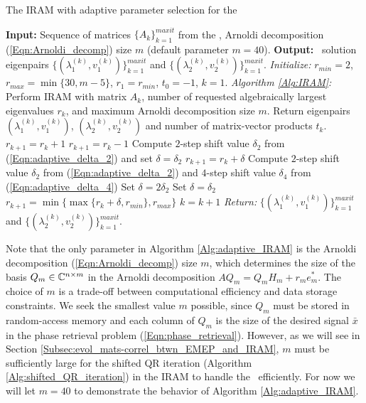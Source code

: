 \begin{algorithm}[H]
\caption{The IRAM with adaptive parameter selection for the \emep}	\label{Alg:adaptive_IRAM}

\begin{algorithmic}[1]
	\Statex 	\textbf{Input:} Sequence of matrices $\{ A_k \}_{k=1}^{maxit}$ from the \emep, Arnoldi decomposition (\ref{Eqn:Arnoldi_decomp})  size $m$ (default parameter $m = 40$).
	\Statex 	\textbf{Output:} \emep \ solution eigenpairs $\{ (\lambda_1^{(k)}, v_1^{(k)}) \}_{k=1}^{maxit}$ and  $\{ (\lambda_2^{(k)}, v_2^{(k)}) \}_{k=1}^{maxit}$.
	\State		\textit{Initialize:} $r_{min}=2$, $r_{max} = \min\{ 30, m-5 \}$, $r_1=r_{min}$, $t_0=-1$, $k=1$.
		\State		\textit{Algorithm \ref{Alg:IRAM}:} Perform IRAM with matrix $A_k$, number of requested algebraically largest eigenvalues $r_k$, and maximum Arnoldi decomposition size $m$.  Return eigenpairs $(\lambda_1^{(k)}, v_1^{(k)} )$, $(\lambda_2^{(k)}, v_2^{(k)} )$ and number of matrix-vector products $t_k$.
			\State 		$r_{k+1} = r_k + 1$
			\State		$r_{k+1} = r_k - 1$
			\State		Compute $2$-step shift value $\delta_2$ from (\ref{Eqn:adaptive_delta_2}) and set $\delta = \delta_2$
			\State		$r_{k+1} = r_k + \delta$
		\Else
			\State 		Compute $2$-step shift value $\delta_2$ from (\ref{Eqn:adaptive_delta_2}) and $4$-step shift value $\delta_4$ from (\ref{Eqn:adaptive_delta_4})
				\State		Set $\delta = 2\delta_2$
			\Else
				\State 			Set $\delta = \delta_2$
			\EndIf
			\State		$r_{k+1} =\min \{ \max \{ r_k + \delta, r_{min} \}, r_{max} \}$
		\EndIf
		\State		$k = k+1$
	\EndWhile
	\State		\textit{Return:} $\{ (\lambda_1^{(k)}, v_1^{(k)}) \}_{k=1}^{maxit}$ and  $\{ (\lambda_2^{(k)}, v_2^{(k)}) \}_{k=1}^{maxit}$.
\end{algorithmic}

\end{algorithm}



Note that the only parameter in Algorithm \ref{Alg:adaptive_IRAM} is the Arnoldi decomposition (\ref{Eqn:Arnoldi_decomp}) size $m$, which determines the size of the basis $Q_m \in {\mathbb C}^{n \times m}$ in the Arnoldi decomposition $AQ_m = Q_mH_m + r_me_m^*$.  
The choice of $m$ is a trade-off between computational efficiency and data storage constraints.
We seek the smallest value $m$ possible, since $Q_m$ must be stored in random-access memory and each column of $Q_m$ is the size of the desired signal $\bar{x}$ in the phase retrieval problem (\ref{Eqn:phase_retrieval}).
However, as we will see in Section \ref{Subsec:evol_mats-correl_btwn_EMEP_and_IRAM}, $m$ must be sufficiently large for the shifted QR iteration (Algorithm \ref{Alg:shifted_QR_iteration}) in the IRAM to handle the \emep \ efficiently.  
For now we will let $m=40$ to demonstrate the behavior of Algorithm \ref{Alg:adaptive_IRAM}.



